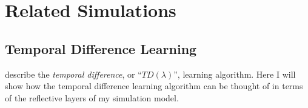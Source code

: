 \chapter{Related Simulations}
\label{chapter:related_simulations}

\section{Temporal Difference Learning}

\cite*{kaelbling:1996} describe the \emph{temporal difference}, or
``$TD(\lambda)$'', learning algorithm.  Here I will show how the
temporal difference learning algorithm can be thought of in terms of
the reflective layers of my simulation model.

